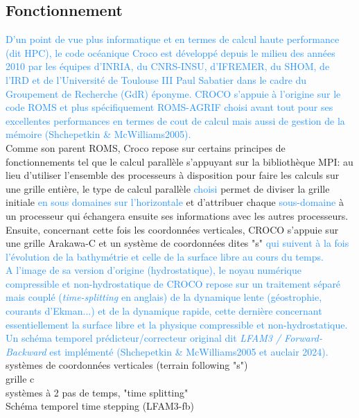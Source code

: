 \documentclass{rapportECC}
\newcommand{\FAadd}[1]{\textcolor{DodgerBlue}{{#1}}}                     %
\begin{document}
\subsection{Fonctionnement}
\FAadd{D'un point de vue plus informatique et en termes de calcul haute performance (dit HPC), le code océanique Croco est développé depuis le milieu des années 2010 par les équipes d'INRIA, du CNRS-INSU, d'IFREMER, du SHOM, de l'IRD et de l'Université de Toulouse III Paul Sabatier dans le cadre du Groupement de Recherche (GdR) éponyme. CROCO s'appuie à l'origine sur le code ROMS et plus spécifiquement ROMS-AGRIF choisi avant tout pour ses excellentes performances en termes de cout de calcul mais aussi de gestion de la mémoire (Shchepetkin \& McWilliams2005).}\\
Comme son parent ROMS, Croco repose sur certains principes de fonctionnements tel que le calcul parallèle s'appuyant sur la bibliothèque MPI: au lieu d'utiliser l'ensemble des processeurs à disposition pour faire les calculs sur une grille entière, le type de calcul parallèle \FAadd{choisi} permet de diviser la grille initiale \FAadd{en sous  domaines sur l'horizontale} et d'attribuer chaque \FAadd{sous-domaine} à un processeur qui échangera ensuite ses informations avec les autres processeurs. \\
Ensuite, concernant cette fois les coordonnées verticales, CROCO s'appuie sur une grille Arakawa-C et un système de coordonnées dites "s" \FAadd{qui suivent à la fois l'évolution de la bathymétrie et celle de la surface libre au cours du temps. \\
A l'image de sa version d'origine (hydrostatique), le noyau numérique compressible et non-hydrostatique de CROCO repose sur un traitement séparé mais couplé (\textit{time-splitting} en anglais) de la dynamique lente (géostrophie, courants d'Ekman...) et de la dynamique rapide, cette dernière concernant essentiellement la surface libre et la physique compressible et non-hydrostatique. Un schéma temporel prédicteur/correcteur original dit \textit{LFAM3 / Forward-Backward} est implémenté (Shchepetkin \& McWilliams2005 et auclair 2024).}\\

systèmes de coordonnées verticales (terrain following "s")\\
grille c\\
systèmes à 2 pas de temps, "time splitting" \\
Schéma temporel time stepping (LFAM3-fb)\\
\end{document}
